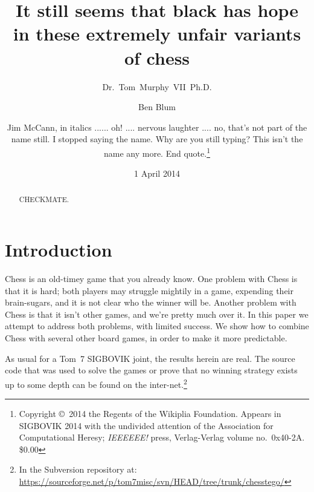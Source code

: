 \documentclass[twocolumn]{article}
\begin{document}
 

\title{It still seems that black has hope in these extremely unfair variants of chess}
\author{Dr.~Tom~Murphy~VII~Ph.D. \and Ben Blum \and
Jim McCann, in italics ...... oh! .... nervous laughter .... no, that's not part of the name still. I stopped saying the name. Why are you still typing? This isn't the name any more. End quote.\thanks{
Copyright \copyright\ 2014 the Regents of the Wikiplia
Foundation. Appears in SIGBOVIK 2014 with the undivided
attention of the Association for Computational Heresy; 
{\em IEEEEEE!} press, Verlag-Verlag volume no.~0x40-2A.
\$0.00}}


\newcommand\checkmate{\hspace{-.05em}\raisebox{.4ex}{\tiny\bf ++}}

\renewcommand\th{\ensuremath{{}^{\textrm{th}}}}
\newcommand\st{\ensuremath{{}^{\textrm{st}}}}
\newcommand\rd{\ensuremath{{}^{\textrm{rd}}}}
\newcommand\nd{\ensuremath{{}^{\textrm{nd}}}}
\newcommand\at{\ensuremath{\scriptstyle @}}

\date{1 April 2014}

\maketitle \thispagestyle{empty}

\begin{abstract}
CHECKMATE.
\end{abstract}

\section*{Introduction}

Chess is an old-timey game that you already know. One problem with
Chess is that it is hard; both players may struggle mightily in a
game, expending their brain-sugars, and it is not clear who the winner
will be. Another problem with Chess is that it isn't other games, and
we're pretty much over it. In this paper we attempt to address both
problems, with limited success. We show how to combine Chess with
several other board games, in order to make it more predictable.

As usual for a Tom~7 SIGBOVIK joint, the results herein are real.
The source code that was used to solve the games or prove that no
winning strategy exists up to some depth can be found on the inter-net.\!\footnote{In the Subversion repository at:
  \url{https://sourceforge.net/p/tom7misc/svn/HEAD/tree/trunk/chesstego/}}
\end{document}
